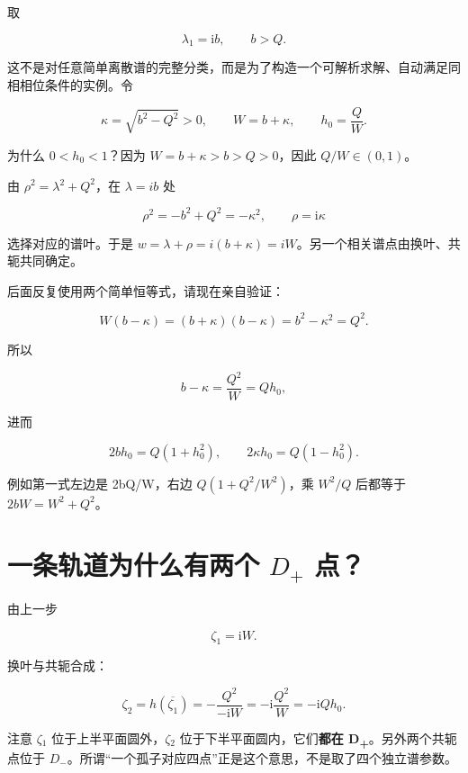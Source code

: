 取\par

\[
\lambda_1=\mathrm{i}b,\qquad b>Q.
\]

这不是对任意简单离散谱的完整分类，而是为了构造一个可解析求解、自动满足同相相位条件的实例。令\par

\[
\kappa=\sqrt{b^2-Q^2}>0,\qquad
W=b+\kappa,\qquad h_0=\dfrac{Q}{W}.
\]

为什么 $0<h_{0}<1$？因为 $W=b+\kappa{}>b>Q>0$，因此 $Q/W\in{}(0,1)$。\par

由 $\rho{}^{2}=\lambda{}^{2}+Q^{2}$，在 $\lambda{}=ib$ 处\par

\[
\rho^2=-b^2+Q^2=-\kappa^2,\qquad
\rho=\mathrm{i}\kappa
\]

选择对应的谱叶。于是 $w=\lambda{}+\rho{}=i(b+\kappa{})=iW$。另一个相关谱点由换叶、共轭共同确定。\par

后面反复使用两个简单恒等式，请现在亲自验证：\par

\[
W(b-\kappa)=(b+\kappa)(b-\kappa)
=b^2-\kappa^2=Q^2.
\]

所以\par

\[
b-\kappa=\dfrac{Q^2}{W}=Qh_0,
\]

进而\par

\[
2bh_0=Q(1+h_0^2),\qquad
2\kappa h_0=Q(1-h_0^2).
\]

例如第一式左边是 2bQ/W，右边 $Q(1+Q^{2}/W^{2})$，乘 $W^{2}/Q$ 后都等于 $2bW=W^{2}+Q^{2}$。\par

\section{一条轨道为什么有两个 \texorpdfstring{$D_+$}{D+} 点？}
\par

由上一步\par

\[
\zeta_1=\mathrm{i}W.
\]

换叶与共轭合成：\par

\[
\zeta_2=h(\overline{\zeta_1})
=-\dfrac{Q^2}{-\mathrm{i}W}
=-\mathrm{i}\dfrac{Q^2}{W}
=-\mathrm{i}Qh_0.
\]

注意 $\zeta{}_{1}$ 位于上半平面圆外，$\zeta{}_{2}$ 位于下半平面圆内，它们\textbf{都在 D\textsubscript{+}}。另外两个共轭点位于 $D_{-}$。所谓“一个孤子对应四点”正是这个意思，不是取了四个独立谱参数。\par


